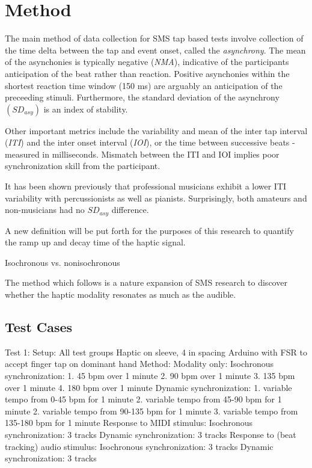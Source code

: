 \chapter{Method}

The main method of data collection for SMS tap based tests involve collection of the time delta between the tap and event onset, called the \textit{asynchrony}. The mean of the asynchonies is typically negative (\textit{NMA}), indicative of the participants anticipation of the beat rather than reaction. Positive asynchonies within the shortest reaction time window (150 ms) are arguably an anticipation of the preceeding stimuli. Furthermore, the standard deviation of the asynchrony $(SD_{asy})$ is an index of stability.  \cite{repp2013sensorimotor}

Other important metrics include the variability and mean of the inter tap interval (\textit{ITI}) and the inter onset interval (\textit{IOI}), or the time between successive beats - measured in milliseconds. Mismatch between the ITI and IOI implies poor synchronization skill from the participant. 

It has been shown previously that professional musicians exhibit a lower ITI variability with percussionists as well as pianists. Surprisingly, both amateurs and non-musicians had no $SD_{asy}$ difference.

A new definition will be put forth for the purposes of this research to quantify the ramp up and decay time of the haptic signal. 

Isochronous vs. nonisochronous ~\cite{polak2016both}

The method which follows is a nature expansion of SMS research to discover whether the haptic modality resonates as much as the audible.

\section{Test Cases}
Test 1:
    Setup:
        All test groups
        Haptic on sleeve, 4 in spacing
        Arduino with FSR to accept finger tap on dominant hand
    Method:
        Modality only:
            Isochronous synchronization:
                1. 45 bpm over 1 minute
                2. 90 bpm over 1 minute
                3. 135 bpm over 1 minute
                4. 180 bpm over 1 minute
            Dynamic synchronization:
                1. variable tempo from 0-45 bpm for 1 minute
                2. variable tempo from 45-90 bpm for 1 minute
                2. variable tempo from 90-135 bpm for 1 minute
                3. variable tempo from 135-180 bpm for 1 minute
        Response to MIDI stimulus:
            Isochronous synchronization:
                3 tracks
            Dynamic synchronization:
                3 tracks
        Response to (beat tracking) audio stimulus:
            Isochronous synchronization:
                3 tracks
            Dynamic synchronization:
                3 tracks

